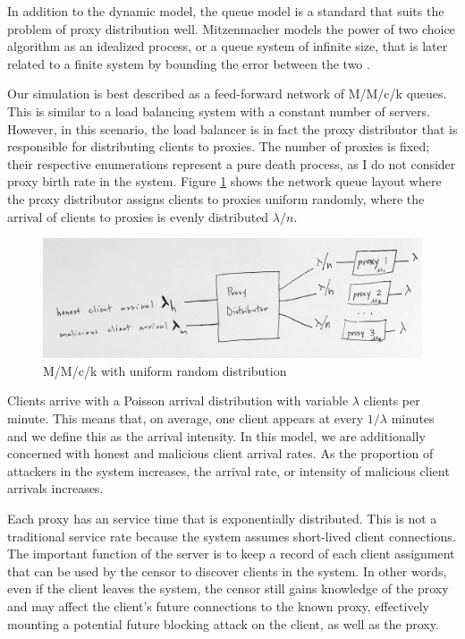 In addition to the dynamic model, the queue model is a standard that suits the problem of proxy distribution well. Mitzenmacher models the power of two choice algorithm as an idealized process, or a queue system of infinite size, that is later related to a finite system by bounding the error between the two \cite{mitzenmacher1996power}. 

Our simulation is best described as a feed-forward network of M/M/c/k queues. This is similar to a load balancing system with a constant number of servers. However, in this scenario, the load balancer is in fact the proxy distributor that is responsible for distributing clients to proxies. The number of proxies is fixed; their respective enumerations represent a pure death process, as I do not consider proxy birth rate in the system. Figure \ref{fig:mmck} shows the network queue layout where the proxy distributor assigns clients to proxies uniform randomly, where the arrival of clients to proxies is evenly distributed $\lambda/n$. 

\begin{figure}[h!]
\centering
     \includegraphics[width=1.0\textwidth]{fig/mmck_queue.png}
    \caption{M/M/c/k with uniform random distribution}

    \label{fig:mmck}
\end{figure}

Clients arrive with a Poisson arrival distribution with variable $\lambda$ clients per minute. This means that, on average, one client appears at every $1 / \lambda$ minutes and we define this as the arrival intensity. In this model, we are additionally concerned with honest and malicious client arrival rates. As the proportion of attackers in the system increases, the arrival rate, or intensity of malicious client arrivals increases.

Each proxy has an service time that is exponentially distributed. This is not a traditional service rate because the system assumes short-lived client connections. The important function of the server is to keep a record of each client assignment that can be used by the censor to discover clients in the system. In other words, even if the client leaves the system, the censor still gains knowledge of the proxy and may affect the client's future connections to the known proxy, effectively mounting a potential future blocking attack on the client, as well as the proxy.

